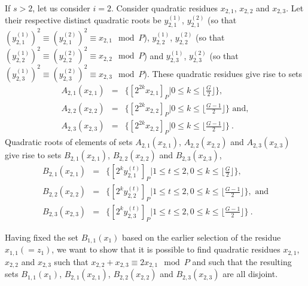 If $s>2$, let us consider $i=2$. Consider quadratic residues
$x_{2,1}$, $x_{2,2}$ and $x_{2,3}$. Let  their respective distinct
quadratic roots be $y_{2,1}^{(1)}$, $y_{2,1}^{(2)}$ (so that
$(y_{2,1}^{(1)})^2 \equiv (y_{2,1}^{(2)})^2 \equiv x_{2,1} \mod
P$), $y_{2,2}^{(1)}$, $y_{2,2}^{(2)}$ (so that $(y_{2,2}^{(1)})^2
\equiv (y_{2,2}^{(2)})^2 \equiv x_{2,2} \mod P$) and
$y_{2,3}^{(1)}$, $y_{2,3}^{(2)}$ (so that $(y_{2,3}^{(1)})^2
\equiv (y_{2,3}^{(2)})^2 \equiv x_{2,3} \mod P$). These quadratic
residues give rise to sets
\begin{eqnarray}
A_{2,1}(x_{2,1})&=&\{ [2^{2k}x_{2,1}]_P | 0 \leq k \leq \lfloor
\frac{G}{2} \rfloor\},\\ A_{2,2}(x_{2,2})&=& \{ [2^{2k}x_{2,2}]_P
| 0
\leq k \leq \lfloor \frac{G-1}{2} \rfloor\} \text{ and},\\
A_{2,3}(x_{2,3})&=& \{ [2^{2k}x_{2,2}]_P | 0 \leq k \leq \lfloor
\frac{G-1}{2} \rfloor\}~.
\end{eqnarray}
Quadratic roots of elements of sets $A_{2,1}(x_{2,1})$,
$A_{2,2}(x_{2,2})$ and $A_{2,3}(x_{2,3})$ give rise to sets
$B_{2,1}(x_{2,1})$, $B_{2,2}(x_{2,2})$ and $B_{2,3}(x_{2,3})$,
\begin{eqnarray}
B_{2,1}(x_{2,1})&=&\{[2^ky_{2,1}^{(t)}]_P | 1 \leq t \leq 2, 0
\leq k
\leq \lfloor \frac{G}{2}\rfloor\},\\
B_{2,2}(x_{2,2})&=&\{[2^ky_{2,2}^{(t)}]_P | 1 \leq t \leq 2, 0
\leq k
\leq \lfloor \frac{G-1}{2}\rfloor\}, \text{ and}\\
B_{2,3}(x_{2,3})&=&\{[2^ky_{2,3}^{(t)}]_P | 1 \leq t \leq 2, 0
\leq k \leq \lfloor \frac{G-1}{2}\rfloor\}~.
\end{eqnarray}


Having fixed the set $B_{1,1}(x_1)$ based on the earlier selection
of the residue $x_{1,1} (=z_1)$, we want to show that it is
possible to find quadratic residues $x_{2,1}$, $x_{2,2}$ and
$x_{2,3}$ such that $x_{2,2} + x_{2,3} \equiv 2x_{2,1} \mod P$ and
such that the resulting sets $B_{1,1}(x_1)$, $B_{2,1}(x_{2,1})$,
$B_{2,2}(x_{2,2})$ and $B_{2,3}(x_{2,3})$ are all disjoint.

